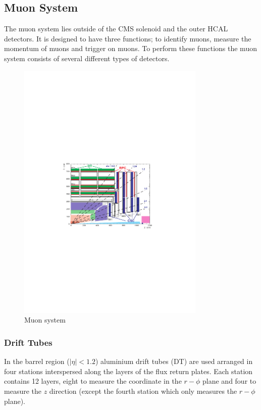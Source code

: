 \subsection{Muon System}
The muon system lies outside of the CMS solenoid and the outer HCAL detectors.
It is designed to have three functions; to identify muons, measure the momentum
of muons and trigger on muons. To perform these functions the muon system
consists of several different types of detectors.

\begin{figure}[ht]
  \centering
  \includegraphics[width=0.8\textwidth]{muon_system}
  \caption{Muon system}
  \label{fig:muon_system}
\end{figure}

\subsubsection{Drift Tubes}
In the barrel region ($|\eta| < 1.2$) aluminium drift tubes (DT) are used
arranged in four stations interspersed along the layers of the flux return
plates. 
Each station contains 12 layers, eight to measure the coordinate in the
$r-\phi$ plane and four to measure the $z$ direction (except the fourth station
which only measures the $r-\phi$ plane). 

